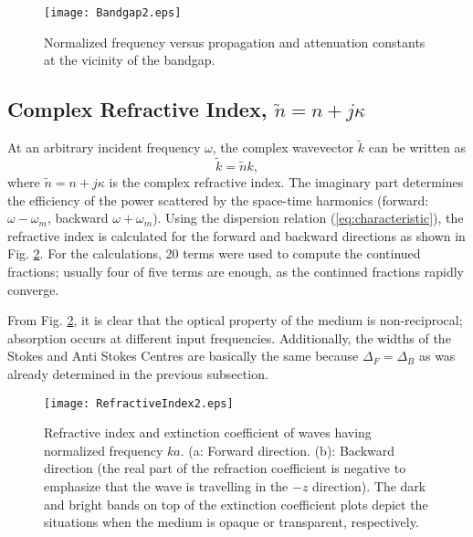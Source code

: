 \documentclass[journal]{IEEEtran}
\begin{document}
\begin{figure}
\centering
\texttt{[image: Bandgap2.eps]}
\caption{Normalized frequency versus propagation and attenuation constants at the vicinity of the bandgap.}
\label{fig:Bandgap}
\end{figure}
\subsection{Complex Refractive Index, $\tilde{n}=n+j\kappa$}
At an arbitrary incident frequency $\omega$, the complex wavevector $\tilde{k}$ can be written as
\begin{equation}
\tilde{k}=\tilde{n}k,
\end{equation}
where $\tilde{n}=n+j\kappa$ is the complex refractive index. The imaginary part determines the efficiency of the power scattered by the space-time harmonics (forward: $\omega-\omega_m$, backward $\omega+\omega_m$). Using the dispersion relation (\ref{eq:characteristic}), the refractive index is calculated for the forward and backward directions as shown in Fig. \ref{fig:RefractiveIndex}. For the calculations, 20 terms were used to compute the continued fractions; usually four of five terms are enough, as the continued fractions rapidly converge.

From Fig. \ref{fig:RefractiveIndex}, it is clear that the optical property of the medium is non-reciprocal; absorption occurs at different input frequencies. Additionally, the widths of the Stokes and Anti Stokes Centres are basically the same because $\Delta_F= \Delta_B$ as was already determined in the previous subsection.
\begin{figure}
\centering
\texttt{[image: RefractiveIndex2.eps]}
\caption{Refractive index and extinction coefficient of waves having normalized frequency $ka$. (a: Forward direction. (b): Backward direction (the real part of the refraction coefficient is negative to emphasize that the wave is travelling in the $-z$ direction). The dark and bright bands on top of the extinction coefficient plots depict the situations when the medium is opaque or transparent, respectively.}
\label{fig:RefractiveIndex}
\end{figure}
\end{document}
